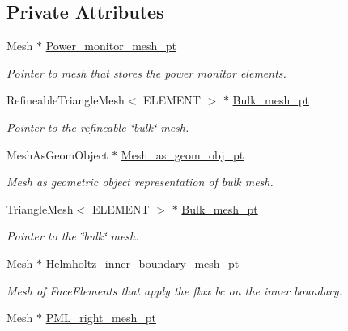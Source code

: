\subsection*{Private Attributes}
\begin{DoxyCompactItemize}
\item 
Mesh $\ast$ \hyperlink{classPMLFourierDecomposedHelmholtzProblem_a9ffebfa69944e405eb28a4b2bd03336e}{Power\+\_\+monitor\+\_\+mesh\+\_\+pt}
\begin{DoxyCompactList}\small\item\em Pointer to mesh that stores the power monitor elements. \end{DoxyCompactList}\item 
Refineable\+Triangle\+Mesh$<$ E\+L\+E\+M\+E\+NT $>$ $\ast$ \hyperlink{classPMLFourierDecomposedHelmholtzProblem_ad20477e869fb9ce66891389c0d501449}{Bulk\+\_\+mesh\+\_\+pt}
\begin{DoxyCompactList}\small\item\em Pointer to the refineable \char`\"{}bulk\char`\"{} mesh. \end{DoxyCompactList}\item 
Mesh\+As\+Geom\+Object $\ast$ \hyperlink{classPMLFourierDecomposedHelmholtzProblem_a32f6694310ffd9c0962a7ee8c114dbf5}{Mesh\+\_\+as\+\_\+geom\+\_\+obj\+\_\+pt}
\begin{DoxyCompactList}\small\item\em Mesh as geometric object representation of bulk mesh. \end{DoxyCompactList}\item 
Triangle\+Mesh$<$ E\+L\+E\+M\+E\+NT $>$ $\ast$ \hyperlink{classPMLFourierDecomposedHelmholtzProblem_a583fb8d30b3a225fe77f684532efd66f}{Bulk\+\_\+mesh\+\_\+pt}
\begin{DoxyCompactList}\small\item\em Pointer to the \char`\"{}bulk\char`\"{} mesh. \end{DoxyCompactList}\item 
Mesh $\ast$ \hyperlink{classPMLFourierDecomposedHelmholtzProblem_a7d3c418942daf7ba2363b8a91172512e}{Helmholtz\+\_\+inner\+\_\+boundary\+\_\+mesh\+\_\+pt}
\begin{DoxyCompactList}\small\item\em Mesh of Face\+Elements that apply the flux bc on the inner boundary. \end{DoxyCompactList}\item 
Mesh $\ast$ \hyperlink{classPMLFourierDecomposedHelmholtzProblem_a2bde26fe496f63d29e48e9b5dffc8757}{P\+M\+L\+\_\+right\+\_\+mesh\+\_\+pt}

\end{DoxyCompactItemize}

